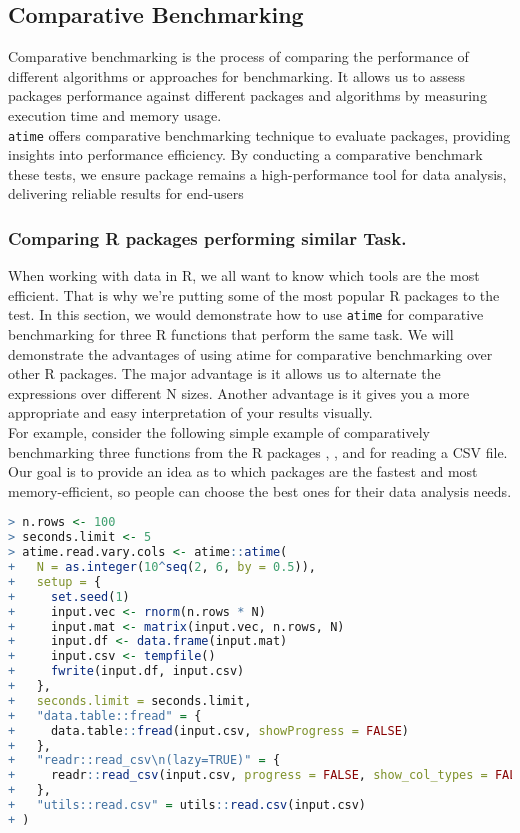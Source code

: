 \subsection{Comparative Benchmarking}

\noindent Comparative benchmarking is the process of comparing the performance of different algorithms or approaches for benchmarking. It allows us to assess packages performance against different packages and algorithms by measuring execution time and memory usage.\\

\noindent \texttt{atime} offers comparative benchmarking technique to evaluate packages, providing insights into performance efficiency. By conducting a comparative benchmark these tests, we ensure package remains a high-performance tool for data analysis, delivering reliable results for end-users\\

\subsubsection{Comparing R packages performing similar Task.}
\noindent When working with data in R, we all want to know which tools are the most efficient. That is why we're putting some of the most popular R packages to the test. 
In this section, we would demonstrate how to use \texttt{atime} for comparative benchmarking for three R functions that perform the same task. We will demonstrate the advantages of using atime for comparative benchmarking over other R packages. The major advantage is it allows us to alternate the expressions over different N sizes. Another advantage is it gives you a more appropriate and easy interpretation of your results visually.\\

\noindent For example, consider the following simple example of comparatively benchmarking three functions from the R packages , , and  for reading a CSV file. Our goal is to provide an idea as to which packages are the fastest and most memory-efficient, so people can choose the best ones for their data analysis needs.\\

\begin{lstlisting}[language=R]
> n.rows <- 100
> seconds.limit <- 5
> atime.read.vary.cols <- atime::atime(
+   N = as.integer(10^seq(2, 6, by = 0.5)),
+   setup = {
+     set.seed(1)
+     input.vec <- rnorm(n.rows * N)
+     input.mat <- matrix(input.vec, n.rows, N)
+     input.df <- data.frame(input.mat)
+     input.csv <- tempfile()
+     fwrite(input.df, input.csv)
+   },
+   seconds.limit = seconds.limit,
+   "data.table::fread" = {
+     data.table::fread(input.csv, showProgress = FALSE)
+   },
+   "readr::read_csv\n(lazy=TRUE)" = {
+     readr::read_csv(input.csv, progress = FALSE, show_col_types = FALSE, lazy = TRUE)
+   },
+   "utils::read.csv" = utils::read.csv(input.csv)
+ )
\end{lstlisting}

